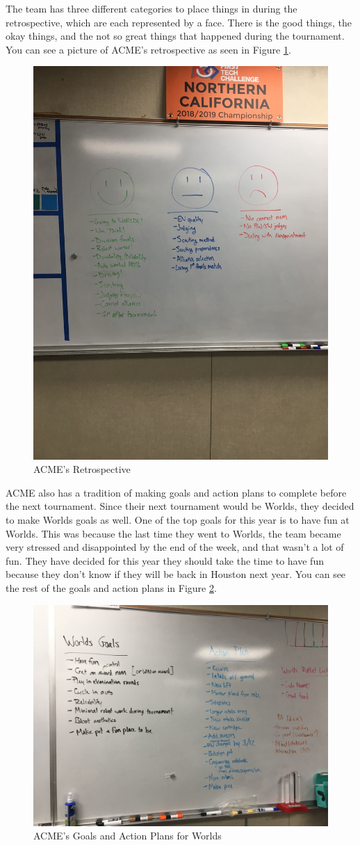 \documentclass{article}
\begin{document}
The team has three different categories to place things in during the retrospective, which are each represented by a face. There is the good things, the okay things, and the not so great things that happened during the tournament. You can see a picture of ACME's retrospective as seen in Figure \ref{fig:retro}. 

\begin{figure}
    \centering
    \includegraphics[width= 0.5 \textwidth]{27_03-04/images/retrospective.JPG}
    \caption{ACME's Retrospective}
    \label{fig:retro}
\end{figure}

ACME also has a tradition of making goals and action plans to complete before the next tournament. Since their next tournament would be Worlds, they decided to make Worlds goals as well. One of the top goals for this year is to have fun at Worlds. This was because the last time they went to Worlds, the team became very stressed and disappointed by the end of the week, and that wasn't a lot of fun. They have decided for this year they should take the time to have fun because they don't know if they will be back in Houston next year. You can see the rest of the goals and action plans in Figure \ref{fig:goals}. 

\begin{figure}
    \centering
    \includegraphics[width= 0.5 \textwidth]{27_03-04/images/goalsandactionplan.JPG}
    \caption{ACME's Goals and Action Plans for Worlds}
    \label{fig:goals}
\end{figure}
\end{document}
